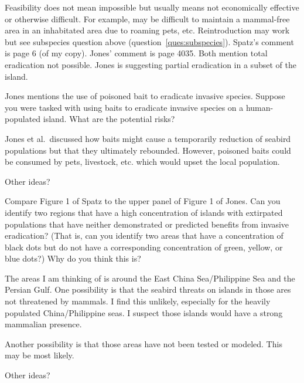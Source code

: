 \documentclass[11pt, addpoints]{exam}
\begin{document}
\begin{questions}
\begin{solution}
	Feasibility does not mean impossible but usually means not economically effective or otherwise difficult. For example, may be difficult to maintain a mammal-free area in an inhabitated area due to roaming pets, etc. Reintroduction may work but see subspecies question above (question~\ref{ques:subspecies}). Spatz's comment is page 6 (of my copy). Jones' comment is page 4035. Both mention total eradication not possible. Jones is suggesting partial eradication in a subset of the island.
\end{solution}


\question[5]
Jones mentions the use of poisoned bait to eradicate invasive species. Suppose you were tasked with using baits to eradicate invasive species on a human-populated island. What are the potential risks?

\begin{solution}
	Jones et al.~discussed how baits might cause a temporarily reduction of seabird populations but that they ultimately rebounded. However, poisoned baits could be consumed by pets, livestock, etc. which would upset the local population.
	
	Other ideas?
\end{solution}


\question[5]
Compare Figure 1 of Spatz to the upper panel of Figure 1 of Jones. Can you identify two regions that have a high concentration of islands with extirpated populations that have neither demonstrated or predicted benefits from invasive eradication? (That is, can you identify two areas that have a concentration of black dots but do not have a corresponding concentration of green, yellow, or blue dots?) Why do you think this is?

\begin{solution}
	The areas I am thinking of is around the East China Sea/Philippine Sea and the Persian Gulf. One possibility is that the seabird threats on islands in those ares not threatened by mammals. I find this unlikely, especially for the heavily populated China/Philippine seas. I suspect those islands would have a strong mammalian presence. 
	
	Another possibility is that those areas have not been tested or modeled. This may be most likely.
	
	Other ideas?
\end{solution}


\end{questions}
\end{document}
